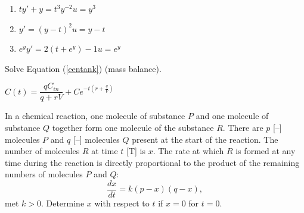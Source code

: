 \begin{enumerate}
\item $ty' + y = t^3y^{-2}$\hfill $u=y^3$
\item $y'  = \left( y - t \right)^2$\hfill $u=y-t$
\item $e^y y' = 2 \left( t + e^y \right) - 1$\hfill $u=e^y$
\end{enumerate}
\fi





\begin{Exercise}
    \Question Solve Equation (\ref{eentank}) (mass balance).
\end{Exercise}

\begin{Answer}
\Question $C(t) = \dfrac{qC_{in}}{q + rV}+ C e^{-t(r+\frac{q}{V})}$
\end{Answer}


\begin{Exercise}
    \Question In a chemical reaction, one molecule of substance $P$ and one molecule of substance $Q$ together form one molecule of the substance $R$.
    There are $p$ [--] molecules $P$ and $q$ [--] molecules $Q$ present at the start of the reaction. The number of molecules $R$ at time $t$ [T] is $x$. The rate at which $R$ is formed at any time during the reaction is directly proportional to the product of the remaining numbers of molecules $P$ and $Q$:
    \[ \dfrac{d x}{d t} = k ( p - x ) ( q - x ),\]
    met $k >0$. Determine $x$ with respect to $t$ if $x = 0$ for $t = 0$.
\end{Exercise}

